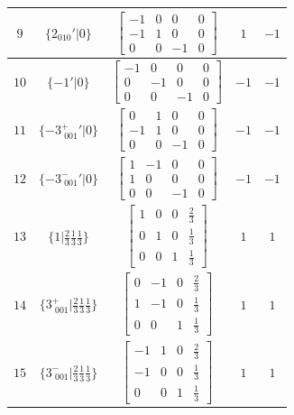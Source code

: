 \documentclass[fleqn,8pt]{jsarticle}
\begin{document}
\begin{longtable}{ccccc}
$ 9 $ & $ \{2{}_{010}{}'|0\} $ & $ \begin{bmatrix} -1 & 0 & 0 & 0 \\ -1 & 1 & 0 & 0 \\ 0 & 0 & -1 & 0 \end{bmatrix} $ & $ 1 $ & $ -1 $ \\ \hline
$ 10 $ & $ \{-1{}'|0\} $ & $ \begin{bmatrix} -1 & 0 & 0 & 0 \\ 0 & -1 & 0 & 0 \\ 0 & 0 & -1 & 0 \end{bmatrix} $ & $ -1 $ & $ -1 $ \\ \hline
$ 11 $ & $ \{-3^{+}_{\,\,001}{}'|0\} $ & $ \begin{bmatrix} 0 & 1 & 0 & 0 \\ -1 & 1 & 0 & 0 \\ 0 & 0 & -1 & 0 \end{bmatrix} $ & $ -1 $ & $ -1 $ \\ \hline
$ 12 $ & $ \{-3^{-}_{\,\,001}{}'|0\} $ & $ \begin{bmatrix} 1 & -1 & 0 & 0 \\ 1 & 0 & 0 & 0 \\ 0 & 0 & -1 & 0 \end{bmatrix} $ & $ -1 $ & $ -1 $ \\ \hline
$ 13 $ & $ \{1|\frac{2}{3} \frac{1}{3} \frac{1}{3}\} $ & $ \begin{bmatrix} 1 & 0 & 0 & \frac{2}{3} \\ 0 & 1 & 0 & \frac{1}{3} \\ 0 & 0 & 1 & \frac{1}{3} \end{bmatrix} $ & $ 1 $ & $ 1 $ \\ \hline
$ 14 $ & $ \{3^{+}_{\,\,001}|\frac{2}{3} \frac{1}{3} \frac{1}{3}\} $ & $ \begin{bmatrix} 0 & -1 & 0 & \frac{2}{3} \\ 1 & -1 & 0 & \frac{1}{3} \\ 0 & 0 & 1 & \frac{1}{3} \end{bmatrix} $ & $ 1 $ & $ 1 $ \\ \hline
$ 15 $ & $ \{3^{-}_{\,\,001}|\frac{2}{3} \frac{1}{3} \frac{1}{3}\} $ & $ \begin{bmatrix} -1 & 1 & 0 & \frac{2}{3} \\ -1 & 0 & 0 & \frac{1}{3} \\ 0 & 0 & 1 & \frac{1}{3} \end{bmatrix} $ & $ 1 $ & $ 1 $ \\ \hline

\end{longtable}
\end{document}
